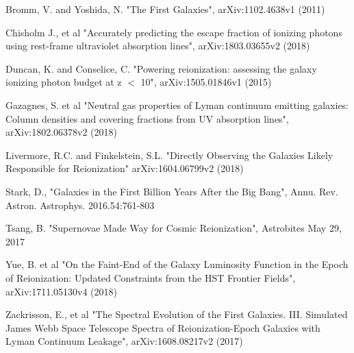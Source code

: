 \documentclass{aastex62}
\begin{document}
\begin{thebibliography}{}
Bromm, V. and Yoshida, N. "The First Galaxies", arXiv:1102.4638v1 (2011)

Chisholm J., et al "Accurately predicting the escape fraction of ionizing photons using rest-frame ultraviolet absorption lines", arXiv:1803.03655v2 (2018)

Duncan, K. and Conselice, C. "Powering reionization: assessing the galaxy ionizing photon budget at z $<$ 10", arXiv:1505.01846v1 (2015)

Gazagnes, S. et al "Neutral gas properties of Lyman continuum emitting galaxies: Column densities and covering fractions from UV absorption lines", arXiv:1802.06378v2 (2018)

Livermore, R.C. and Finkelstein, S.L. "Directly Observing the Galaxies Likely Responsible for Reionization" arXiv:1604.06799v2 (2018)

Stark, D., "Galaxies in the First Billion Years After the Big Bang", Annu. Rev. Astron. Astrophys. 2016.54:761-803

Tsang, B. "Supernovae Made Way for Cosmic Reionization", Astrobites May 29, 2017

Yue, B. et al "On the Faint-End of the Galaxy Luminosity Function in the Epoch of Reionization: Updated Constraints from the HST Frontier Fields", arXiv:1711.05130v4 (2018)

Zackrisson, E., et al "The Spectral Evolution of the First Galaxies. III. Simulated James Webb Space Telescope Spectra of Reionization-Epoch Galaxies with Lyman Continuum Leakage", arXiv:1608.08217v2 (2017)

\end{thebibliography}


\end{document}
